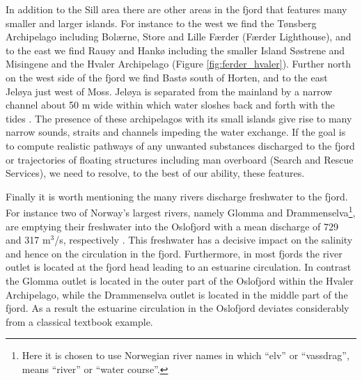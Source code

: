 In addition to the {\DR} Sill area there are other areas in the fjord that features many smaller and larger islands. For instance to the west we find the T{\o}nsberg Archipelago including Bol{\ae}rne, Store and Lille F{\ae}rder (F{\ae}rder Lighthouse), and to the east we find Rau{\o}y and Hank{\o} including the smaller Island S{\o}strene and Misingene and the Hvaler Archipelago (Figure \ref{fig:ferder_hvaler}). Further north on the west side of the fjord we find Bast{\o} south of Horten, and to the east Jel{\o}ya just west of Moss. Jel{\o}ya is separated from the mainland by a narrow channel about 50 m wide within which water sloshes back and forth with the tides \citep{hjelm:etal:2014}. The presence of these archipelagos with its small islands give rise to many narrow sounds, straits and channels impeding the water exchange. If the goal is to compute realistic pathways of any unwanted substances discharged to the fjord or trajectories of floating structures including man overboard (Search and Rescue Services), we need to resolve, to the best of our ability, these features. 

Finally it is worth mentioning the many rivers discharge freshwater to the fjord. For instance two of Norway's largest rivers, namely Glomma and Drammenselva\footnote{Here it is chosen to use Norwegian river names in which ``elv'' or ``vassdrag'', means ``river'' or ``water course''.}, are emptying their freshwater into the Oslofjord with a mean discharge of 729 and 317 m$^3$/s, respectively \citep{milli:etal:2011}. This freshwater has a decisive impact on the salinity and hence on the circulation in the fjord. Furthermore, in most fjords the river outlet is located at the fjord head leading to an estuarine circulation. In contrast the Glomma outlet is located in the outer part of the Oslofjord within the Hvaler Archipelago, while the Drammenselva outlet is located in the middle part of the fjord. As a result the estuarine circulation in the Oslofjord deviates considerably from a classical textbook example.        


